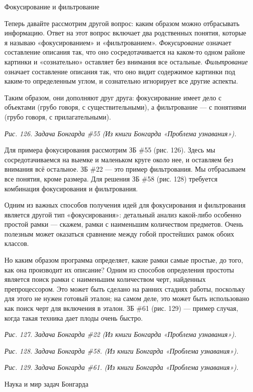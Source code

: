 \documentclass[../main.tex]{subfiles}
\begin{document}
Фокусирование и фильтрование

Теперь давайте рассмотрим другой вопрос: каким образом можно отбрасывать информацию. Ответ на этот вопрос включает два родственных понятия, которые я называю «фокусированием» и «фильтрованием». \emph{Фокусирование} означает составление описания так, что оно сосредотачивается на каком-то одном районе картинки и «сознательно» оставляет без внимания все остальные. \emph{Фильтрование} означает составление описания так, что оно видит содержимое картинки под каким-то определенным углом, и сознательно игнорирует все другие аспекты.

Таким образом, они дополняют друг друга: фокусирование имеет дело с объектами (грубо говоря, с существительными), а фильтрование --- с понятиями (грубо говоря, с прилагательными).

\emph{Рис. 126. Задача Бонгарда \#55 (Из книги Бонгарда «Проблема узнавания»).}

Для примера фокусирования рассмотрим ЗБ \#55 (рис. 126). Здесь мы сосредотачиваемся на выемке и маленьком круге около нее, и оставляем без внимания всё остальное. ЗБ \#22 --- это пример фильтрования. Мы отбрасываем все понятия, кроме размера. Для решения ЗБ \#58 (рис. 128) требуется комбинация фокусирования и фильтрования.

Одним из важных способов получения идей для фокусирования и фильтрования является другой тип «фокусирования»: детальный анализ какой-либо особенно простой рамки --- скажем, рамки с наименьшим количеством предметов. Очень полезным может оказаться сравнение между гобой простейших рамок обоих классов.

Но каким образом программа определяет, какие рамки самые простые, до того, как она производит их описание? Одним из способов определения простоты является поиск рамки с наименьшим количеством черт, найденных препроцессором. Это может быть сделано на ранних стадиях работы, поскольку для этого не нужен готовый эталон; на самом деле, это может быть использовано как поиск черт для включения в эталон. ЗБ \#61 (рис. 129) --- пример случая, когда такая техника дает плоды очень быстро.

\emph{Рис. 127. Задача Бонгарда \#22 (Из книги Бонгарда «Проблема узнавания»).}

\emph{Рис. 128. Задача Бонгарда \#58. (Из книги Бонгарда «Проблема узнавания»).}

\emph{Рис. 129. Задача Бонгарда \#61. (Из книги Бонгарда «Проблема узнавания»).}

Наука и мир задач Бонгарда
\end{document}
